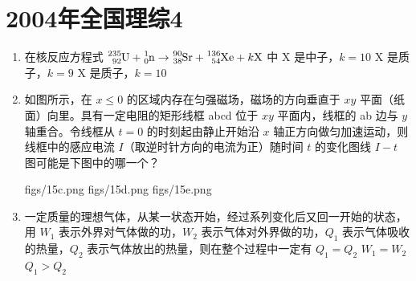 \documentclass[\gkver]{gaokaozhenti}
\begin{document}
\chapter{2004年全国理综4}

\begin{enumerate}
\item
在核反应方程式 $\ce{^{235}_{92}U} + \ce{^{1}_{0}n} \to \ce{^{90}_{38}Sr} + \ce{^{136}_{54}Xe} + k\ce{X}$ 中
{X 是中子，$k=10$}
{X 是质子，$k=9$}
{X 是质子，$k=10$}

\item
如图所示，在 $x\leq 0$ 的区域内存在匀强磁场，磁场的方向垂直于 $xy$ 平面（纸面）向里。具有一定电阻的矩形线框 abcd 位于 $xy$ 平面内，线框的 ab 边与 $y$ 轴重合。令线框从 $t=0$ 的时刻起由静止开始沿 $x$ 轴正方向做匀加速运动，则线框中的感应电流 $I$（取逆时针方向的电流为正）随时间 $t$ 的变化图线 $I-t$ 图可能是下图中的哪一个？


{figs/15c.png}
{figs/15d.png}
{figs/15e.png}

\item
一定质量的理想气体，从某一状态开始，经过系列变化后又回一开始的状态，用 $W_{1}$ 表示外界对气体做的功，$W_{2}$ 表示气体对外界做的功，$Q_{1}$ 表示气体吸收的热量，$Q_{2}$ 表示气体放出的热量，则在整个过程中一定有
{$Q_{1}=Q_{2}$}
{$W_{1}=W_{2}$}
{$Q_{1}>Q_{2}$}


\end{enumerate}
\end{document}
